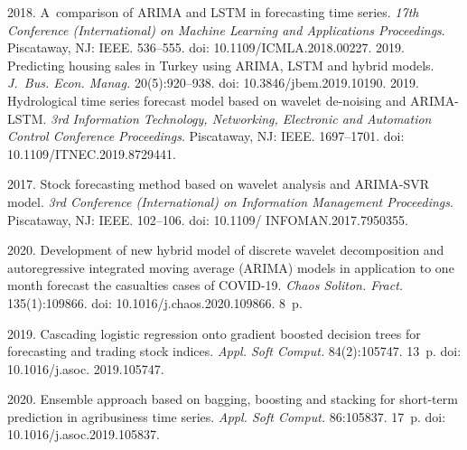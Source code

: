 \begin{multicols}{2}
{{\begin{thebibliography}{99}
 2018. A~comparison of ARIMA and LSTM 
in forecasting time series. 
\textit{17th Conference (International) on Machine Learning and Applications Proceedings}. 
Piscataway, NJ: IEEE. 536--555. doi: 10.1109/ICMLA.2018.00227.
 2019. Predicting housing sales in Turkey using ARIMA, 
LSTM and hybrid models. \textit{J.~Bus. Econ. Manag.} 20(5):920--938. doi: 10.3846/jbem.2019.10190.
 2019. Hydrological time series forecast model based on wavelet de-noising 
and ARIMA-LSTM. \textit{3rd Information Technology, Networking, Electronic and Automation Control 
Conference Proceedings}. Piscataway, NJ: IEEE. 1697--1701. doi: 10.1109/\linebreak ITNEC.2019.8729441.


 2017. Stock forecasting method based on wavelet analysis and ARIMA-SVR model. 
\textit{3rd Conference (International)  on Information Management Proceedings}.
Piscataway, NJ: IEEE. 102--106. 
doi: 10.1109/ \mbox{INFOMAN}.2017.7950355.

 2020. Development of new hybrid model of discrete wavelet decomposition and autoregressive 
 integrated moving average (ARIMA) models in application to one month forecast the casualties cases 
 of COVID-19. \textit{Chaos Soliton. Fract.} 135(1):109866. doi: 10.1016/j.chaos.2020.109866. 8~p.
 

 2019. Cascading logistic regression onto gradient boosted decision trees for forecasting and 
 trading stock indices. \textit{\mbox{Appl}. Soft Comput.} 84(2):105747. 13~p. 
 doi: 10.1016/j.asoc. 2019.105747. 
 
 2020. Ensemble approach based on bagging, boosting and stacking for short-term prediction in
  agribusiness time series. \textit{Appl. Soft Comput.} 86:105837. 17~p. 
  doi: 10.1016/j.asoc.2019.105837. 
  

\end{thebibliography}}}
\end{multicols}

